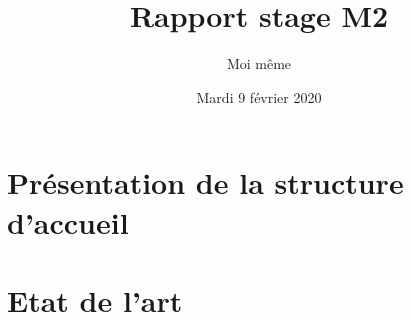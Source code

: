 \documentclass[a4paper, 12pt, hidelinks]{article}
\title{Rapport stage M2}
\author{Moi même}
\date{Mardi 9 février 2020}
\begin{document}
\maketitle
\newpage
\tableofcontents
\newpage


\section{Présentation de la structure d'accueil}
\newpage
\section{Etat de l'art}








\end{document}
